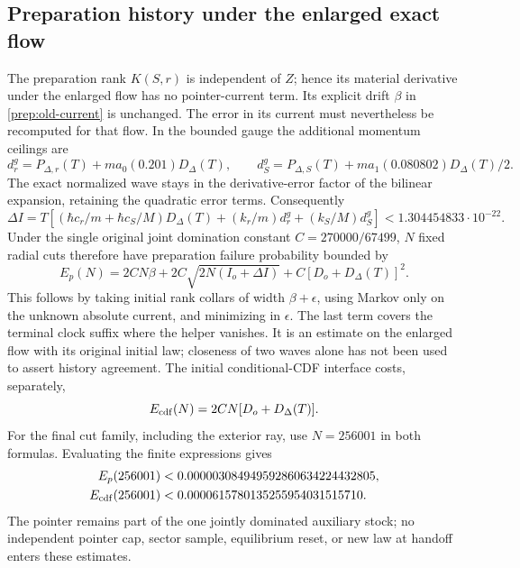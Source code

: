\documentclass[11pt]{article}
\theoremstyle{definition}\newtheorem{definition}[theorem]{Definition}
\theoremstyle{remark}\newtheorem{remark}[theorem]{Remark}
\begin{document}
\subsection{Preparation history under the enlarged exact flow}
\label{prep:history}
The preparation rank $K(S,r)$ is independent of $Z$; hence its material
derivative under the enlarged flow has no pointer-current term. Its
explicit drift $\beta$ in \eqref{prep:old-current} is unchanged. The
error in its current must nevertheless be recomputed for that flow.
In the bounded gauge the additional momentum ceilings are
\[
 d_r^g=P_{\Delta,r}(T)+ma_0(0.201)D_\Delta(T),\qquad
 d_S^g=P_{\Delta,S}(T)+ma_1(0.080802)D_\Delta(T)/2.
\]
The exact normalized wave stays in the derivative-error factor of the
bilinear expansion, retaining the quadratic error terms. Consequently
\begin{equation}
 \Delta I=T\left[(\hbar c_r/m+\hbar c_S/M)D_\Delta(T)
                           +(k_r/m)d_r^g+(k_S/M)d_S^g\right]
       <1.304454833\cdot10^{-22}. \label{prep:extra-current}
\end{equation}
Under the single original joint domination constant
$C=270000/67499$, $N$ fixed radial cuts therefore have preparation
failure probability bounded by
\begin{equation}
 E_p(N)=2CN\beta+2C\sqrt{2N(I_o+\Delta I)}
                        +C[D_o+D_\Delta(T)]^2.
 \label{prep:event}
\end{equation}
This follows by taking initial rank collars of width
$\beta+\epsilon$, using Markov only on the unknown absolute current,
and minimizing in $\epsilon$. The last term covers the terminal clock
suffix where the helper vanishes. It is an estimate on the enlarged
flow with its original initial law; closeness of two waves alone has
not been used to assert history agreement.
The initial conditional-CDF interface costs, separately,
\begin{equation}
 E_{\rm cdf}(N)=2CN[D_o+D_\Delta(T)]. \label{prep:cdf}
\end{equation}
For the final cut family, including the exterior ray, use $N=256001$
in both formulas. Evaluating the finite expressions gives
\[
 \begin{aligned}
 E_p(256001)&<0.000003084949592860634224432805,\\
 E_{\rm cdf}(256001)&<0.0000615780135255954031515710.
 \end{aligned}
\]
The pointer remains part of the one jointly dominated auxiliary stock;
no independent pointer cap, sector sample, equilibrium reset, or new law
at handoff enters these estimates.
\end{document}
